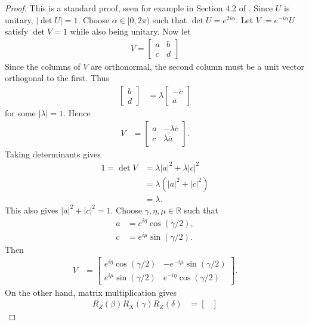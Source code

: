 \begin{proof}
This is a standard proof, seen for example in Section 4.2 of \cite{MikeAndIke}. Since $U$ is unitary, $|\det U|=1$. Choose $\alpha \in [0,2\pi)$ such that $\det U = e^{2i\alpha}$. Let $V := e^{-i\alpha}U$ satisfy $\det V=1$ while also being unitary. Now let
\begin{align}
V =
\begin{bmatrix}
a & b \\
c & d
\end{bmatrix}
\end{align}
Since the columns of $V$ are orthonormal, the second column must be a unit vector orthogonal to the first. Thus
\begin{align}
\begin{bmatrix}
b \\
d
\end{bmatrix}
&=
\lambda
\begin{bmatrix}
-\overline c \\
\overline a
\end{bmatrix}
\end{align}
for some $|\lambda|=1$. Hence
\begin{align}
V
&=
\begin{bmatrix}
a & -\lambda \overline c \\
c & \lambda \overline a
\end{bmatrix}.
\end{align}
Taking determinants gives
\begin{align}
1
=
\det V
&=
\lambda |a|^2 + \lambda |c|^2 \\
&=
\lambda (|a|^2+|c|^2) \\
&=
\lambda.
\end{align}
This also gives $|a|^2 + |c|^2 = 1$. Choose $\gamma,\eta,\mu \in \mathbb{R}$ such that
\begin{align}
a &= e^{i\eta}\cos(\gamma/2), \\
c &= e^{i\mu}\sin(\gamma/2).
\end{align}
Then
\begin{align}
V
&=
\begin{bmatrix}
e^{i\eta}\cos(\gamma/2) & -e^{-i\mu}\sin(\gamma/2) \\
e^{i\mu}\sin(\gamma/2) & e^{-i\eta}\cos(\gamma/2)
\end{bmatrix}.
\end{align}
On the other hand, matrix multiplication gives
\begin{align}
R_Z(\beta)R_X(\gamma)R_Z(\delta)
&=
\begin{bmatrix}

\end{bmatrix}
\end{align}
\end{proof}
